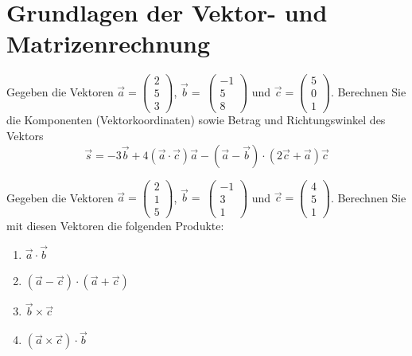 \section{ Grundlagen der Vektor- und Matrizenrechnung}

\begin{ejercicio}[Vektoroperationen]
    Gegeben die Vektoren $\vec{a} = \begin{pmatrix}
        2\\
        5\\
        3
    \end{pmatrix}$, $\vec{b} =~\begin{pmatrix}
        -1\\
        5\\
        8
    \end{pmatrix}$ und $\vec{c} = \begin{pmatrix}
        5\\
        0\\
        1
    \end{pmatrix}$.
    Berechnen Sie die Komponenten (Vektorkoordinaten) sowie Betrag und Richtungswinkel des Vektors
    \begin{equation*}
        \vec{s} = -3\vec{b} + 4 (\vec{a} \cdot \vec{c}) \vec{a} - (\vec{a} -\vec{b}) \cdot (2 \vec{c} + \vec{a}) \vec{c}
    \end{equation*}
\end{ejercicio}

\begin{ejercicio}
    Gegeben die Vektoren $\vec{a} = \begin{pmatrix}
        2\\
        1\\
        5
    \end{pmatrix}$, $\vec{b} =~\begin{pmatrix}
        -1\\
        3\\
        1
    \end{pmatrix}$ und $\vec{c} = \begin{pmatrix}
        4\\
        5\\
        1
    \end{pmatrix}$.
    Berechnen Sie mit diesen Vektoren die folgenden Produkte:
    \begin{enumerate}
        \item $\vec{a} \cdot \vec{b}$
        \item $(\vec{a} - \vec{c}) \cdot (\vec{a} + \vec{c})$
        \item $\vec{b} \times \vec{c}$
        \item $(\vec{a} \times \vec{c}) \cdot \vec{b}$
    \end{enumerate}
\end{ejercicio}

